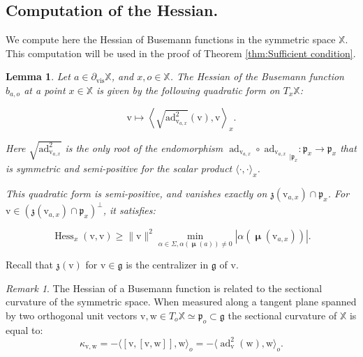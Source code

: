 \documentclass[reqno,10pt]{amsart}
\theoremstyle{plain}
\newtheorem{lem}[thm]{Lemma}
\theoremstyle{definition}
\theoremstyle{remark}
\newtheorem{rem}[thm]{Remark}
\DeclareMathOperator{\vis}{vis}
\DeclareMathOperator{\Cartan}{\boldsymbol{\mu}}
\DeclareMathOperator{\Hess}{Hess}
\DeclareMathOperator{\ad}{ad}
\newcommand{\X}{\mathbb{X}}
\begin{document}
\subsection{Computation of the Hessian.}

We compute here the Hessian of Busemann functions in the symmetric space $\X$. This computation will be used in the proof of Theorem \ref{thm:Sufficient condition}.

\begin{lem}
\label{lem:HessianofBusemannFunctions}
Let $a\in \partial_{\vis}\X$, and $x,o\in \X$. The Hessian of the Busemann function $b_{a,o}$ at a point $x\in \X$ is given by the following quadratic form on $T_x\X$:

\begin{equation}
\label{eq:HessianBusemann}
\mathrm{v}\mapsto  \left\langle \sqrt{\ad_{\mathrm{v}_{a,x}}^2}(\mathrm{v}) ,\mathrm{v}\right\rangle_x.
\end{equation}

Here $\sqrt{\ad_{\mathrm{v}_{a,x}}^2}$ is the only root of the endomorphism ${\ad_{\mathrm{v}_{a,x}}\circ \ad_{\mathrm{v}_{a,x}}}_{|\mathfrak{p}_x}:\mathfrak{p}_x\to \mathfrak{p}_x$ that is symmetric and semi-positive for the scalar product $\langle\cdot,\cdot\rangle_x$.

\medskip

This quadratic form is semi-positive, and vanishes exactly on $\mathfrak{z}(\mathrm{v}_{a,x})\cap \mathfrak{p}_x$. For $\mathrm{v}\in (\mathfrak{z}(\mathrm{v}_{a,x})\cap \mathfrak{p}_x)^\perp$, it satisfies: 

\begin{equation}
\label{eq:HessianBusemannInequality}
\Hess_x(\mathrm{v},\mathrm{v})\geq \lVert\mathrm{v}\rVert^2\min_{\alpha \in \Sigma,\alpha(\Cartan(a))\neq 0}|\alpha(\Cartan(\mathrm{v}_{a,x}))|.
\end{equation}
\end{lem}

Recall that $\mathfrak{z}(\mathrm{v})$ for $\mathrm{v}\in \mathfrak{g}$ is the centralizer in $\mathfrak{g}$ of $\mathrm{v}$.

\begin{rem}
\label{rem:secCurvature}
The Hessian of a Busemann function is related to the sectional curvature of the symmetric space. When measured along a tangent plane spanned by two orthogonal unit vectors $\mathrm{v},\mathrm{w}\in T_o\X\simeq \mathfrak{p}_o\subset \mathfrak{g}$ the sectional curvature of $\X$ is equal to:
$$\kappa_{\mathrm{v},\mathrm{w}}=-\langle [\mathrm{v},[\mathrm{v},\mathrm{w}]], \mathrm{w} \rangle_o=-\langle \ad_{\mathrm{v}}^2(\mathrm{w}), \mathrm{w} \rangle_o.$$
\end{rem}
\end{document}
